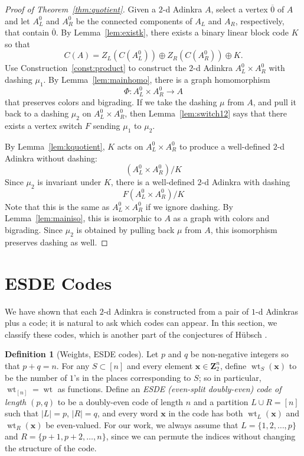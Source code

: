 \documentclass[12pt,twoside,singlespace]{article}
\numberwithin{equation}{section}
\theoremstyle{definition}
\newtheorem{definition}[equation]{Definition}
\newcommand{\ZZ}{\mathbf{Z}}
\newcommand{\on}{\operatorname}
\newcommand{\wt}{\on{wt}}
\renewcommand{\vec}[1]{\mathbf{#1}}
\begin{document}
\begin{proof}[Proof of Theorem~\ref{thm:quotient}]
Given a $2$-d Adinkra $A$, select a vertex $\overline{0}$ of $A$ and let $A_L^0$ and $A_R^0$ be the connected components of $A_L$ and $A_R$, respectively, that contain $\overline{0}$.  By Lemma~\ref{lem:existk}, there exists a binary linear block code $K$ so that
\[C(A)=Z_L(C(A_L^0))\oplus Z_R(C(A_R^0))\oplus K.
\]
Use Construction~\ref{const:product} to construct the $2$-d Adinkra $A_L^0\times A_R^0$ with dashing $\mu_1$.
By Lemma~\ref{lem:mainhomo}, there is a graph homomorphism
\[\Phi:A_L^0\times A_R^0 \to A\]
that preserves colors and bigrading.  If we take the dashing $\mu$ from $A$, and pull it back to a dashing $\mu_2$ on $A_L^0\times A_R^0$, then Lemma~\ref{lem:switch12} says that there exists a vertex switch $F$ sending $\mu_1$ to $\mu_2$.

By Lemma~\ref{lem:kquotient}, $K$ acts on $A_L^0\times A_R^0$ to produce a well-defined $2$-d Adinkra without dashing:
\[(A_L^0\times A_R^0)/K\]
Since $\mu_2$ is invariant under $K$, there is a well-defined $2$-d Adinkra with dashing
\[F(A_L^0\times A_R^0)/K\]
Note that this is the same as $A_L^0\times A_R^0$ if we ignore dashing.  By Lemma~\ref{lem:mainiso}, this is isomorphic to $A$ as a graph with colors and bigrading.  Since $\mu_2$ is obtained by pulling back $\mu$ from $A$, this isomorphism preserves dashing as well.
\end{proof}



\section{ESDE Codes}

We have shown that each $2$-d Adinkra is constructed from a pair of $1$-d Adinkras plus a code; it is natural to ask which codes can appear. In this section, we classify these codes, which is another part of the conjectures of H\"ubsch \cite{hubsch:weaving}. 

\begin{definition}[Weights, ESDE codes]
Let $p$ and $q$ be non-negative integers so that $p+q=n$. For any $S \subset [n]$ and every element $\vec{x} \in \ZZ_2^n$, define $\wt_S(\vec{x})$ to be the number of $1$'s in the places corresponding to $S$; so in particular, $\wt_{[n]} = \wt$ as functions. Define an \emph{ESDE (even-split doubly-even) code of length $(p,q)$} to be a doubly-even code of length $n$ and a partition $L \cup R = [n]$ such that $|L| = p$, $|R| = q$, and every word $\vec{x}$ in the code has both $\wt_L(\vec{x})$ and $\wt_R(\vec{x})$ be even-valued. For our work, we always assume that $L = \{1, 2, \ldots, p\}$ and $R = \{p+1, p+2, \ldots, n\}$, since we can permute the indices without changing the structure of the code.
\end{definition}
\end{document}
